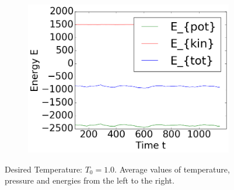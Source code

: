 \begin{figure}[ht]
\begin{subfigure}{0.3\textwidth}
\end{subfigure}
\hfill
\begin{subfigure}{0.3\textwidth}
\includegraphics[width=\textwidth]{../dat/avEnergies_T1d0_F20d0_M100.png}
\end{subfigure}
\caption{
Desired Temperature: $T_0=1.0$.
Average values of temperature, pressure and energies from the left to the right.}
\label{9T1d0}
\end{figure}

